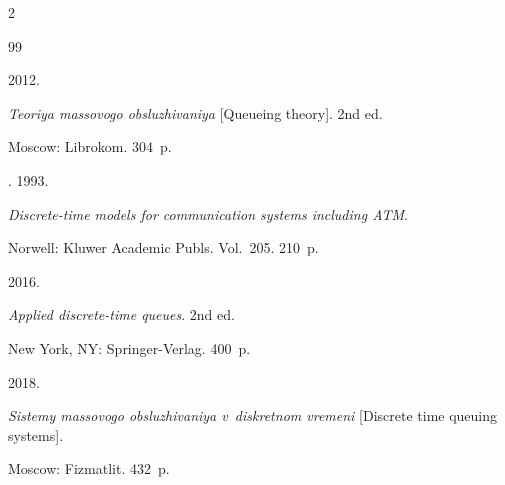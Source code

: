   \begin{multicols}{2}



\renewcommand{\bibname}{\protect\rmfamily References}




{\small\frenchspacing

 {%


 \begin{thebibliography}{99}







 2012.

\textit{Teoriya massovogo obsluzhivaniya} [Queueing theory]. 2nd ed.

Moscow: Librokom. 304~p.





. 1993.

\textit{Discrete-time models for communication systems including ATM}. 

Norwell: Kluwer Academic Publs. Vol.~205. 210~p.

 





 2016. 

\textit{Applied discrete-time queues}. 2nd ed. 

New York, NY: Springer-Verlag. 400~p.





 2018. 

\textit{Sistemy massovogo obsluzhivaniya v~diskretnom vremeni} [Discrete time queuing systems]. 

Moscow: Fizmatlit. 432~p.







\end{thebibliography}}}
\end{multicols}

